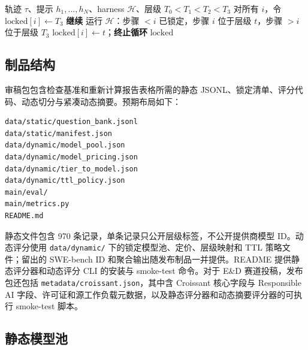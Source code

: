 \begin{algorithm}[ht]
\caption{顺序锁定降级搜索（每条轨迹）}
\label{alg:seq-lock}
\scriptsize
\begin{algorithmic}[1]
\REQUIRE 轨迹 $\tau$、提示 $h_1,\ldots,h_N$、harness $\mathcal{H}$、层级 $T_0<T_1<T_2<T_3$
\STATE 对所有 $i$，令 $\text{locked}[i]\leftarrow T_3$
    \STATE \textbf{继续}
  \ENDIF
    \STATE 运行 $\mathcal{H}$：步骤 $<i$ 已锁定，步骤 $i$ 位于层级 $t$，步骤 $>i$ 位于层级 $T_3$
      \STATE $\text{locked}[i]\leftarrow t$；\textbf{终止循环}
    \ENDIF
  \ENDFOR
\ENDFOR
\RETURN $\text{locked}$
\end{algorithmic}
\end{algorithm}

\subsection{制品结构}
\label{app:artifact}

审稿包包含检查基准和重新计算报告表格所需的静态 JSONL、锁定清单、评分代码、动态切分与紧凑动态摘要。预期布局如下：

\begin{center}
\begin{minipage}{0.95\linewidth}
\scriptsize
\begin{verbatim}
data/static/question_bank.jsonl
data/static/manifest.json
data/dynamic/model_pool.json
data/dynamic/model_pricing.json
data/dynamic/tier_to_model.json
data/dynamic/ttl_policy.json
main/eval/
main/metrics.py
README.md
\end{verbatim}
\end{minipage}
\end{center}

静态文件包含 970 条记录，单条记录只公开层级标签，不公开提供商模型 ID。动态评分使用 \texttt{data/dynamic/} 下的锁定模型池、定价、层级映射和 TTL 策略文件；留出的 SWE-bench ID 和聚合输出随发布制品一并提供。README 提供静态评分器和动态评分 CLI 的安装与 smoke-test 命令。对于 E\&D 赛道投稿，发布包还包括 \texttt{metadata/croissant.json}，其中含 Croissant 核心字段与 Responsible AI 字段、许可证和源工作负载元数据，以及静态评分器和动态摘要评分器的可执行 smoke-test 脚本。

\subsection{静态模型池}
\label{app:model-pool}

